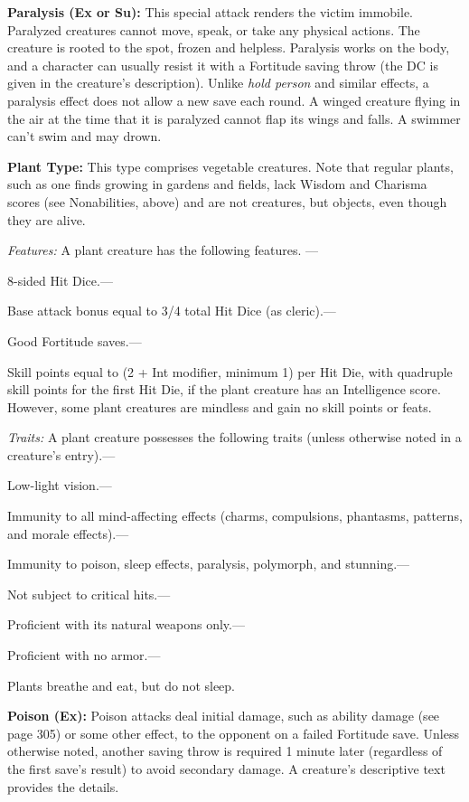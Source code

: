 \documentclass{article}
\begin{document}
\vspace{12pt}
\textbf{Paralysis (Ex or Su): }This special attack renders the victim immobile. 
Paralyzed creatures cannot move, speak, or take any physical actions. The creature 
is rooted to the spot, frozen and helpless. Paralysis works on the body, and a 
character can usually resist it with a Fortitude saving throw (the DC is given 
in the creature's description). Unlike \textit{hold person }and similar effects, 
a paralysis effect does not allow a new save each round. A winged creature flying 
in the air at the time that it is paralyzed cannot flap its wings and falls. A 
swimmer can't swim and may drown. 

\vspace{12pt}
\textbf{Plant Type:} This type comprises vegetable creatures. Note that regular 
plants, such as one finds growing in gardens and fields, lack Wisdom and Charisma 
scores (see Nonabilities, above) and are not creatures, but objects, even though 
they are alive. 

\textit{Features: }A plant creature has the following features. ---

8-sided Hit Dice.---

Base attack bonus equal to 3/4 total Hit Dice (as cleric).---

Good Fortitude saves.---

Skill points equal to (2 + Int modifier, minimum 1) per Hit Die, with quadruple 
skill points for the first Hit Die, if the plant creature has an Intelligence score. 
However, some plant creatures are mindless and gain no skill points or feats.

\textit{Traits: }A plant creature possesses the following traits (unless otherwise 
noted in a creature's entry).---

Low-light vision.---

Immunity to all mind-affecting effects (charms, compulsions, phantasms, patterns, 
and morale effects).---

Immunity to poison, sleep effects, paralysis, polymorph, and stunning.---

Not subject to critical hits.---

Proficient with its natural weapons only.---

Proficient with no armor.---

Plants breathe and eat, but do not sleep.

\vspace{12pt}
\textbf{Poison (Ex):} Poison attacks deal initial damage, such as ability damage 
(see page 305) or some other effect, to the opponent on a failed Fortitude save. 
Unless otherwise noted, another saving throw is required 1 minute later (regardless 
of the first save's result) to avoid secondary damage. A creature's descriptive 
text provides the details.
\end{document}
